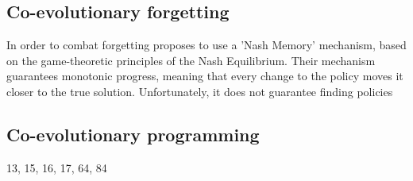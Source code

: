 
\subsection{Co-evolutionary forgetting}
In order to combat forgetting \cite{ficici2003game} proposes to use a 'Nash Memory' mechanism, based on the game-theoretic principles of the Nash Equilibrium. Their mechanism guarantees monotonic progress, meaning that every change to the policy moves it closer to the true solution. Unfortunately, it does not guarantee finding policies 

\subsection{Co-evolutionary programming}
13, 15, 16, 17, 64, 84
